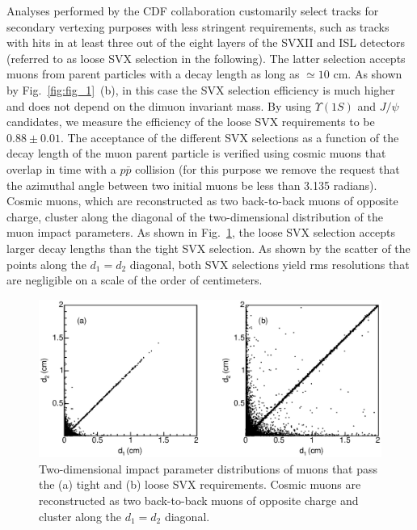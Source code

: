 \documentclass[aps,prd,preprint,floatfix,nofootinbib,superscriptaddress,showpacs,amssymb]{revtex4}
\begin{document}
 Analyses performed by the CDF collaboration customarily select tracks for
 secondary vertexing  purposes with less stringent requirements, such as 
 tracks with hits in at least three out of the eight layers of the SVXII 
 and ISL detectors (referred to as loose SVX selection in the following). 
 The latter selection accepts muons from parent particles with a decay 
 length as long as $\simeq 10$ cm. As shown by Fig.~\ref{fig:fig_1}~(b),
 in this case the SVX selection efficiency is much higher and does not 
 depend on the dimuon invariant mass. By using $\Upsilon(1S)$ and $J/\psi$ 
 candidates, we measure the efficiency of the loose SVX requirements to be 
 $0.88 \pm 0.01$. The acceptance of the different SVX selections as a 
 function of the decay length of the muon parent particle is verified
 using cosmic muons that overlap in time with a $p\bar{p}$ collision (for
 this purpose we remove the request that the azimuthal angle between two
 initial muons be less than 3.135 radians). Cosmic muons, which are 
 reconstructed as two back-to-back muons of opposite charge, cluster along
 the diagonal of the two-dimensional distribution of the muon impact  
 parameters. As shown in Fig.~\ref{fig:fig_cosm}, the loose SVX selection
 accepts larger decay lengths than the tight SVX selection. As shown by the
 scatter of the points along the $d_1=d_2$ diagonal, both SVX selections
 yield rms resolutions that are negligible on a scale of
 the order of centimeters.
 \begin{figure}[]
 \begin{center}
 \vspace{-0.2in}
 \leavevmode
 \includegraphics*[width=\textwidth]{kosm.eps}
 \caption[] {Two-dimensional  impact parameter distributions of muons that
             pass the (a) tight and (b) loose SVX requirements. Cosmic muons
             are reconstructed as two back-to-back muons of opposite charge 
             and cluster along the $d_1=d_2$ diagonal.}
 \label{fig:fig_cosm}
 \end{center}
 \end{figure}
\end{document}
